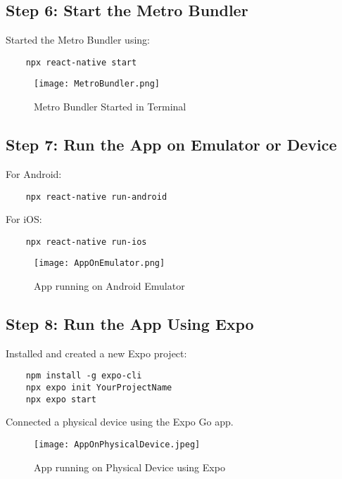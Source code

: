 \documentclass{article}
\begin{document}
\subsection{Step 6: Start the Metro Bundler}
Started the Metro Bundler using:
\begin{verbatim}
    npx react-native start
\end{verbatim}

\begin{figure}[H]
    \centering
    \texttt{[image: MetroBundler.png]}
    \caption{Metro Bundler Started in Terminal}
    \label{fig:metro_bundler}
\end{figure}

\subsection{Step 7: Run the App on Emulator or Device}
For Android:
\begin{verbatim}
    npx react-native run-android
\end{verbatim}
For iOS:
\begin{verbatim}
    npx react-native run-ios
\end{verbatim}

\begin{figure}[H]
    \centering
    \texttt{[image: AppOnEmulator.png]}
    \caption{App running on Android Emulator}
    \label{fig:emulator}
\end{figure}

\subsection{Step 8: Run the App Using Expo}
Installed and created a new Expo project:
\begin{verbatim}
    npm install -g expo-cli
    npx expo init YourProjectName
    npx expo start
\end{verbatim}
Connected a physical device using the Expo Go app.

\begin{figure}[H]
    \centering
    \texttt{[image: AppOnPhysicalDevice.jpeg]}
    \caption{App running on Physical Device using Expo}
    \label{fig:expo_device}
\end{figure}
\end{document}
